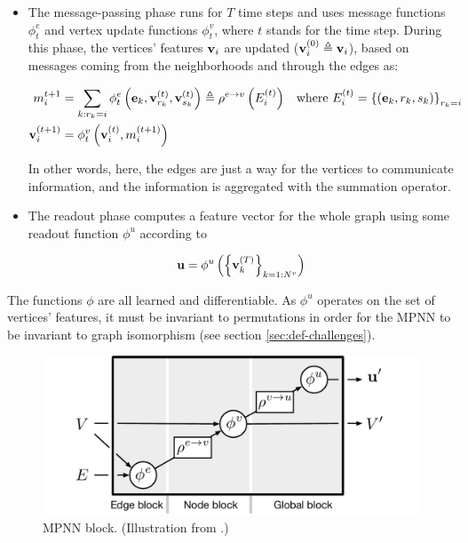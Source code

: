 \documentclass{article}
\begin{document}
\begin{itemize}
    \item The message-passing phase runs for $T$ time steps and uses message functions $\phi_t^e$ and vertex update functions $\phi_t^v$, where $t$ stands for the time step. During this phase, the vertices' features $\mathbf{v}_i$ are updated ($\mathbf{v}_i^{(0)} \triangleq \mathbf{v}_i$), based on messages coming from the neighborhoods and through the edges as:
    
    \begin{equation*}
        \begin{aligned}
        m_i^{t+1} &= \sum_{k:r_k=i} \phi_t^e \left( \mathbf{e}_k, \mathbf{v}_{r_k}^{(t)}, \mathbf{v}_{s_k}^{(t)} \right) \triangleq \rho^{e \rightarrow v} \left( E_{i}^{(t)} \right) & \text{where } E_{i}^{(t)} = \left\{ \left( \mathbf{e}_k, r_k, s_k \right) \right\}_{r_k=i} \\
        \mathbf{v}_{i}^{(t+1)} &= \phi_t^v \left( \mathbf{v}_{i}^{(t)}, m_i^{(t+1)} \right) &
        \end{aligned}
    \end{equation*}
    
    In other words, here, the edges are just a way for the vertices to communicate information, and the information is aggregated with the summation operator.
    
    \item The readout phase computes a feature vector for the whole graph using some readout function $\phi^u$ according to
    
    \begin{equation*}
        \mathbf{u} = \phi^u \left( \left\{ \mathbf{v}_k^{(T)} \right\}_{k=1:N^v} \right)
    \end{equation*}
\end{itemize}

The functions $\phi$ are all learned and differentiable. As $\phi^u$ operates on the set of vertices' features, it must be invariant to permutations in order for the MPNN to be invariant to graph isomorphism (see section \ref{sec:def-challenges}).

\begin{figure}[h]
    \centering
    \includegraphics[scale=.5]{images/GN-mpnn-block.pdf}
    \caption{MPNN block. (Illustration from \cite{battaglia2018relational}.)}
    \label{fig:mpnn}
\end{figure}
\end{document}

